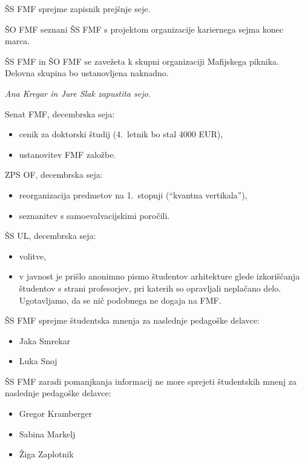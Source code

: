 \documentclass{seja}
\begin{document}
\begin{ad}
    \item
    \begin{sklep*}
        ŠS FMF sprejme zapisnik prejšnje seje.
    \end{sklep*}
    \item
    ŠO FMF seznani ŠS FMF s projektom organizacije kariernega sejma konec marca.
    \item
    \begin{sklep*}
        ŠS FMF in ŠO FMF se zavežeta k skupni organizaciji Mafijskega piknika. Delovna skupina bo ustanovljena naknadno.
    \end{sklep*}

    \textit{Ana Kregar in Jure Slak zapustita sejo.}
    \item
   Senat FMF, decembrska seja:
  \begin{itemize}
      \item cenik za doktorski študij (4.~letnik bo stal 4000 EUR),
    \item ustanovitev FMF založbe.
  \end{itemize}
  ZPS OF, decembrska seja:
  \begin{itemize}
      \item reorganizacija predmetov na 1.~stopnji (``kvantna vertikala''),
      \item seznanitev s samoevalvacijskimi poročili.
  \end{itemize}
  ŠS UL, decembrska seja:
  \begin{itemize}
      \item volitve,
      \item v javnost je prišlo anonimno pismo študentov arhitekture glede izkoriščanja študentov s strani profesorjev, pri katerih so opravljali neplačano delo. Ugotavljamo, da se nič podobnega ne dogaja na FMF.
  \end{itemize}

  \item
    \begin{sklep*}
    ŠS FMF sprejme študentska mnenja za naslednje pedagoške delavce:
        \begin{itemize}
            \item Jaka Smrekar
            \item Luka Snoj
        \end{itemize}
    ŠS FMF zaradi pomanjkanja informacij ne more sprejeti študentskih mnenj za naslednje pedagoške delavce:
        \begin{itemize}
            \item Gregor Kramberger
            \item Sabina Markelj
            \item Žiga Zaplotnik
        \end{itemize}
    \end{sklep*}


\end{ad}
\end{document}
